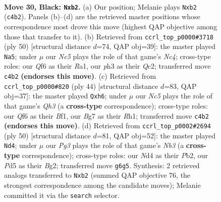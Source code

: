 \documentclass[11pt]{article}
\begin{document}
\clearpage

\begin{figure}[p]\centering
\begin{subfigure}{0.46\textwidth}\centering
\resizebox{\linewidth}{!}{%
\newchessgame
\chessboard[
  setfen={r5k1/1p3pb1/5qp1/p2p4/2nn3p/7P/PP3PPB/RN1BQ1K1 b - - 3 30},
  showmover=false,
  pgfstyle=straightmove, color=movearrow, markmove={c4-b2}
]}
\caption{}
\end{subfigure}\hfill
\begin{subfigure}{0.46\textwidth}\centering
\resizebox{\linewidth}{!}{%
\newchessgame
\chessboard[
  setfen={3qr1k1/1b3pp1/3p3p/2p3b1/2NpP3/1B1P3P/1PQ2PP1/R5K1 w - - 0 26},
  showmover=false,
  pgfstyle=straightmove, color=movearrow, markmove={c4-a5}
]}
\caption{}
\end{subfigure}
\\[4pt]
\begin{subfigure}{0.46\textwidth}\centering
\resizebox{\linewidth}{!}{%
\newchessgame
\chessboard[
  setfen={3r2k1/pb1n1p2/2q3pp/4p3/2p5/P1N1PP1Q/1P4PP/4KB1R w K - 0 23},
  showmover=false,
  pgfstyle=straightmove, color=movearrow, markmove={h3-h6}
]}
\caption{}
\end{subfigure}\hfill
\begin{subfigure}{0.46\textwidth}\centering
\resizebox{\linewidth}{!}{%
\newchessgame
\chessboard[
  setfen={2q3k1/p3bppp/1n2p3/1b2N3/1p2Q2P/1N4P1/PP2PPB1/6K1 w - - 0 26},
  showmover=false,
  pgfstyle=straightmove, color=movearrow, markmove={b3-d4}
]}
\caption{}
\end{subfigure}
\caption{\textbf{Move 30, Black: \texttt{Nxb2}.} (a) Our position; Melanie plays \texttt{Nxb2} (\texttt{c4b2}). Panels (b)--(d) are the retrieved master positions whose correspondence most drove this move (highest QAP objective among those that transfer to it). (b) Retrieved from \texttt{ccrl\_top\_p0000\#3718} (ply 50) [structural distance $d$=74, QAP obj=39]: the master played \texttt{Na5}; under $\mu$ our \emph{Nc5} plays the role of that game's \emph{Nc4}; cross-type roles: our \emph{Q}f6 as their \emph{R}a1, our \emph{p}h3 as their \emph{Q}c2; transferred move \texttt{c4b2} \textbf{(endorses this move)}. (c) Retrieved from \texttt{ccrl\_top\_p0000\#820} (ply 44) [structural distance $d$=83, QAP obj=37]: the master played \texttt{Qxh6}; under $\mu$ our \emph{Nc5} plays the role of that game's \emph{Qh3} (a \textbf{cross-type} correspondence); cross-type roles: our \emph{Q}f6 as their \emph{B}f1, our \emph{B}g7 as their \emph{R}h1; transferred move \texttt{c4b2} \textbf{(endorses this move)}. (d) Retrieved from \texttt{ccrl\_top\_p0002\#2694} (ply 50) [structural distance $d$=81, QAP obj=52]: the master played \texttt{Nd4}; under $\mu$ our \emph{Pg3} plays the role of that game's \emph{Nb3} (a \textbf{cross-type} correspondence); cross-type roles: our \emph{N}d4 as their \emph{P}b2, our \emph{P}d5 as their \emph{B}g2; transferred move \texttt{g6g5}. Synthesis: 2 retrieved analogs transferred to \texttt{Nxb2} (summed QAP objective 76, the strongest correspondence among the candidate moves); Melanie committed it via the \texttt{search} selector.}
\label{fig:thought-m59}
\end{figure}
\end{document}

